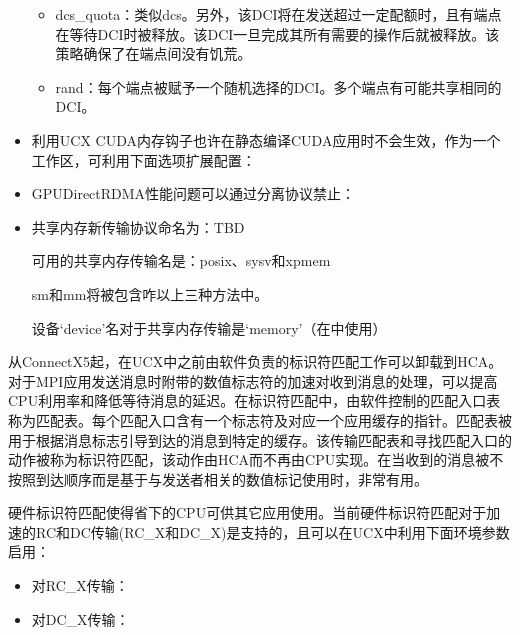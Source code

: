 \documentclass[a4paper,12pt,english]{sphinxmanual}
\begin{document}
\begin{itemize}
\begin{itemize}
\item {} 
\sphinxAtStartPar
dcs\_quota：类似dcs。另外，该DCI将在发送超过一定配额时，且有端点在等待DCI时被释放。该DCI一旦完成其所有需要的操作后就被释放。该策略确保了在端点间没有饥荒。

\item {} 
\sphinxAtStartPar
rand：每个端点被赋予一个随机选择的DCI。多个端点有可能共享相同的DCI。

\end{itemize}

\item {} 
\sphinxAtStartPar
利用UCX
CUDA内存钩子也许在静态编译CUDA应用时不会生效，作为一个工作区，可利用下面选项扩展配置：

\sphinxAtStartPar
{}

\item {} 
\sphinxAtStartPar
GPUDirectRDMA性能问题可以通过分离协议禁止：

\sphinxAtStartPar
{}

\item {} 
\sphinxAtStartPar
共享内存新传输协议命名为：TBD

\sphinxAtStartPar
可用的共享内存传输名是：posix、sysv和xpmem

\sphinxAtStartPar
sm和mm将被包含咋以上三种方法中。

\sphinxAtStartPar
设备‘device’名对于共享内存传输是‘memory’（在中使用）

\end{itemize}

\sphinxAtStartPar
{}

\sphinxAtStartPar
{}

\sphinxAtStartPar
从ConnectX\sphinxhyphen{}5起，在UCX中之前由软件负责的标识符匹配工作可以卸载到HCA。对于MPI应用发送消息时附带的数值标志符的加速对收到消息的处理，可以提高CPU利用率和降低等待消息的延迟。在标识符匹配中，由软件控制的匹配入口表称为匹配表。每个匹配入口含有一个标志符及对应一个应用缓存的指针。匹配表被用于根据消息标志引导到达的消息到特定的缓存。该传输匹配表和寻找匹配入口的动作被称为标识符匹配，该动作由HCA而不再由CPU实现。在当收到的消息被不按照到达顺序而是基于与发送者相关的数值标记使用时，非常有用。

\sphinxAtStartPar
硬件标识符匹配使得省下的CPU可供其它应用使用。当前硬件标识符匹配对于加速的RC和DC传输(RC\_X和DC\_X)是支持的，且可以在UCX中利用下面环境参数启用：
\begin{itemize}
\item {} 
\sphinxAtStartPar
对RC\_X传输： 

\item {} 
\sphinxAtStartPar
对DC\_X传输： 

\end{itemize}
\end{document}
